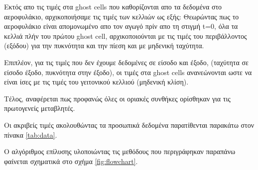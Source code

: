 Εκτός απο τις τιμές στα ghost cells που καθορίζονται απο τα δεδομένα στο αεροφυλάκιο, αρχικοποιήσαμε τις τιμές των κελλιών ως εξής: Θεωρώντας πως το αεροφυλάκιο είναι απομονωμένο απο τον αγωγό πρίν απο τη στιγμή t=0, όλα τα κελλιά πλήν του πρώτου ghost cell, αρχικοποιούνται με τις τιμές του περιβάλλοντος (εξόδου) για την πυκνότητα και την πίεση και με μηδενική ταχύτητα.

Επιπλέον, για τις τιμές που δεν έχουμε δεδομένες σε είσοδο και έξοδο, (ταχύτητα σε είσοδο έξοδο, πυκνότητα στην έξοδο), οι τιμές στα ghost cells ανανεώνονται ωστε να είναι ίσες με τις τιμές του γειτονικού κελλιού (μηδενική κλίση).

Τέλος, αναφέρεται πως προφανώς όλες οι οριακές συνθήκες ορίσθηκαν για τις πρωτογενείς μεταβλητές.

Οι ακριβείς τιμές ακολουθώντας τα προσωπικά δεδομένα παρατίθενται παρακάτω στον πίνακα \ref{tab:data}.


Ο αλγόριθμος επίλυσης υλοποιώντας τις μεθόδους που περιγράφηκαν παραπάνω φαίνεται σχηματικά στο σχήμα \ref{fig:flowchart}.


\setlength{\fboxrule}{2pt} %
\setlength{\fboxsep}{15pt} %

